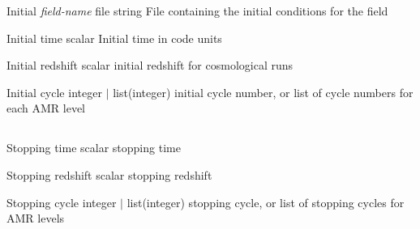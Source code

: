 \documentclass{article}
\begin{document}
\Parameter
{Initial}
{\textit{field-name}}
{file}
{string}
{}
{File containing the initial conditions for the field}
{}
{}

\Parameter
{Initial}
{}
{time}
{scalar}
{}
{Initial time in code units}
{}
{}

\Parameter
{Initial}
{}
{redshift}
{scalar}
{}
{initial redshift for cosmological runs}
{}
{}

\Parameter
{Initial}
{}
{cycle}
{integer $|$ list(integer)}
{}
{initial cycle number, or list of cycle numbers for each AMR level}
{}
{}

\subsection{}

\Parameter
{Stopping}
{}
{time}
{scalar}
{}
{stopping time}
{}
{}

\Parameter
{Stopping}
{}
{redshift}
{scalar}
{}
{stopping redshift}
{}
{}
{}

\Parameter
{Stopping}
{}
{cycle}
{integer $|$ list(integer)}
{}
{stopping cycle, or list of stopping cycles for AMR levels}
{}


\subsection{}
\end{document}
